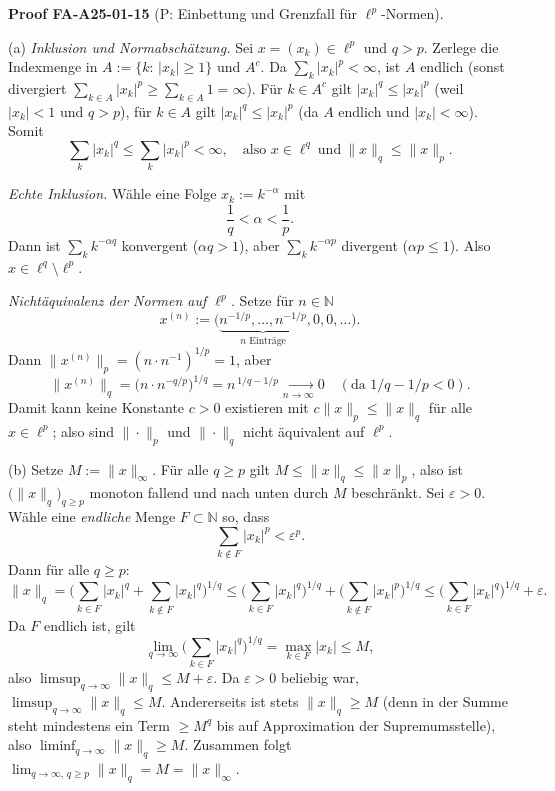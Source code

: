 \documentclass[10pt, letterpaper]{article}
\newcommand{\CustomHeading}[3]{%
  \par\medskip\noindent%
  \textbf{#1 #2} \textnormal{(#3)}.\enskip%
}
\newenvironment{PROOF}[2]{\begin{unitbox}\CustomHeading{Proof}{#1}{#2}}{\end{unitbox}}
\begin{document}
\begin{PROOF}{FA-A25-01-15}{P: Einbettung und Grenzfall für $\ell^p$-Normen}
(a) \emph{Inklusion und Normabschätzung.} Sei $x=(x_k)\in \ell^{p}$ und $q>p$.
Zerlege die Indexmenge in $A:=\{k:\,|x_k|\ge 1\}$ und $A^{c}$.
Da $\sum_k |x_k|^{p}<\infty$, ist $A$ endlich (sonst divergiert $\sum_{k\in A}|x_k|^{p}\ge \sum_{k\in A}1=\infty$).
Für $k\in A^{c}$ gilt $|x_k|^{q}\le |x_k|^{p}$ (weil $|x_k|<1$ und $q>p$), für $k\in A$ gilt
$|x_k|^{q}\le |x_k|^{p}$ (da $A$ endlich und $|x_k|<\infty$).
Somit
\[
\sum_k |x_k|^{q}\le \sum_k |x_k|^{p}<\infty,\quad\text{also }x\in \ell^{q}\ \text{und}\ \|x\|_{q}\le \|x\|_{p}.
\]

\emph{Echte Inklusion.} Wähle eine Folge $x_k:=k^{-\alpha}$ mit
\[
\frac{1}{q}<\alpha<\frac{1}{p}.
\]
Dann ist $\sum_k k^{-\alpha q}$ konvergent ($\alpha q>1$), aber
$\sum_k k^{-\alpha p}$ divergent ($\alpha p\le 1$). Also $x\in \ell^{q}\setminus \ell^{p}$.

\emph{Nichtäquivalenz der Normen auf $\ell^{p}$.} Setze für $n\in\mathbb{N}$
\[
x^{(n)}:=\big(\underbrace{n^{-1/p},\dots,n^{-1/p}}_{n\text{ Einträge}},0,0,\dots\big).
\]
Dann $\|x^{(n)}\|_{p}=(n\cdot n^{-1})^{1/p}=1$, aber
\[
\|x^{(n)}\|_{q}=\big(n\cdot n^{-q/p}\big)^{1/q}=n^{\,1/q-1/p}\xrightarrow[n\to\infty]{}0
\quad(\text{da }1/q-1/p<0).
\]
Damit kann keine Konstante $c>0$ existieren mit $c\|x\|_{p}\le \|x\|_{q}$ für alle $x\in \ell^{p}$;
also sind $\|\cdot\|_{p}$ und $\|\cdot\|_{q}$ nicht äquivalent auf $\ell^{p}$.

\smallskip
(b) Setze $M:=\|x\|_{\infty}$. Für alle $q\ge p$ gilt $M\le \|x\|_{q}\le \|x\|_{p}$, also ist
$\big(\|x\|_{q}\big)_{q\ge p}$ monoton fallend und nach unten durch $M$ beschränkt.
Sei $\varepsilon>0$. Wähle eine \emph{endliche} Menge $F\subset \mathbb{N}$ so, dass
\[
\sum_{k\notin F}|x_k|^{p}<\varepsilon^{p}.
\]
Dann für alle $q\ge p$:
\[
\|x\|_{q}
=\Big(\sum_{k\in F}|x_k|^{q}+\sum_{k\notin F}|x_k|^{q}\Big)^{\!1/q}
\le \Big(\sum_{k\in F}|x_k|^{q}\Big)^{\!1/q}+\Big(\sum_{k\notin F}|x_k|^{p}\Big)^{\!1/q}
\le \Big(\sum_{k\in F}|x_k|^{q}\Big)^{\!1/q}+\varepsilon.
\]
Da $F$ endlich ist, gilt
\[
\lim_{q\to\infty}\Big(\sum_{k\in F}|x_k|^{q}\Big)^{1/q}=\max_{k\in F}|x_k|\le M,
\]
also $\limsup_{q\to\infty}\|x\|_{q}\le M+\varepsilon$. Da $\varepsilon>0$ beliebig war,
$\limsup_{q\to\infty}\|x\|_{q}\le M$.
Andererseits ist stets $\|x\|_{q}\ge M$ (denn in der Summe steht mindestens ein Term
$\ge M^{q}$ bis auf Approximation der Supremumsstelle), also $\liminf_{q\to\infty}\|x\|_{q}\ge M$.
Zusammen folgt $\lim_{q\to\infty,\,q\ge p}\|x\|_{q}=M=\|x\|_{\infty}$.
\end{PROOF}
\end{document}
